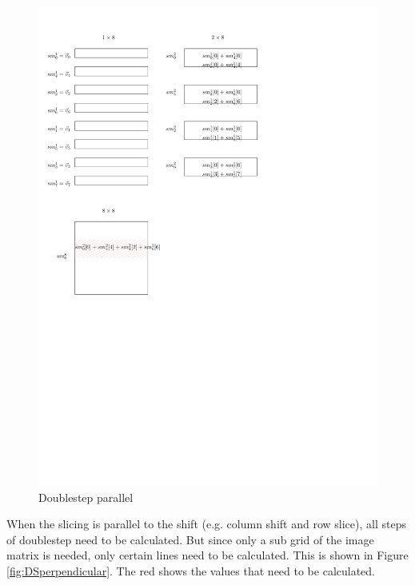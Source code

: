 \documentclass[12pt]{article}
\begin{document}
\begin{figure}
\includegraphics[scale=0.7]{Doublestep_parallel}
\caption{Doublestep parallel}
\label{fig:DSparallel}
\end{figure}

When the slicing is parallel to the shift (e.g. column shift and row slice), all steps of doublestep need to be calculated. But since only a sub grid of the image matrix is needed, only certain lines need to be calculated. This is shown in Figure \ref{fig:DSperpendicular}. The red shows the values that need to be calculated.
\end{document}

